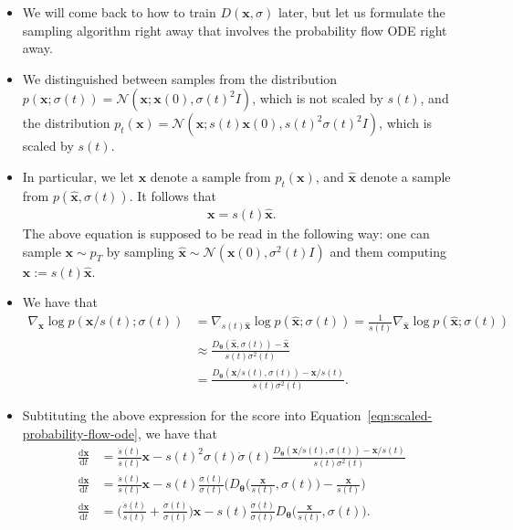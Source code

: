 \documentclass[10pt]{article}
\newcommand{\dee}{\mathrm{d}}
\newcommand{\ve}[1]{\mathbf{#1}}
\newcommand{\ves}[1]{\boldsymbol{#1}}
\newcommand{\mcal}[1]{\mathcal{#1}}
\begin{document}
\begin{itemize}
  \item We will come back to how to train $D(\ve{x},\sigma)$ later, but let us formulate the sampling algorithm right away that involves the probability flow ODE right away.
  
  \item We distinguished between samples from the distribution $p(\ve{x};\sigma(t)) = \mcal{N}(\ve{x}; \ve{x}(0), \sigma(t)^2 I)$, which is not scaled by $s(t)$, and the distribution $p_t(\ve{x}) = \mcal{N}(\ve{x}; s(t)\ve{x}(0), s(t)^2 \sigma(t)^2 I)$, which is scaled by $s(t)$.
    
  \item In particular, we let $\ve{x}$ denote a sample from $p_t(\ve{x})$, and $\hat{\ve{x}}$ denote a sample from $p(\hat{\ve{x}}, \sigma(t))$. It follows that
  \begin{align*}
    \ve{x} = s(t) \hat{\ve{x}}.
  \end{align*}
  The above equation is supposed to be read in the following way: one can sample $\ve{x} \sim p_T$ by sampling $\hat{\ve{x}} \sim \mcal{N}(\ve{x}(0), \sigma^2(t)I)$ and them computing $\ve{x} := s(t)\hat{\ve{x}}$.

  \item We have that
  \begin{align*}
    \nabla_{\ve{x}} \log p(\ve{x}/s(t); \sigma(t))
    &= \nabla_{s(t)\hat{\ve{x}}} \log p(\hat{\ve{x}}; \sigma(t))
    = \frac{1}{s(t)} \nabla_{\hat{\ve{x}}} \log p(\hat{\ve{x}}; \sigma(t)) \\
    &\approx \frac{D_{\ves{\theta}}(\hat{\ve{x}}, \sigma(t)) - \hat{\ve{x}}}{s(t)\sigma^2(t)} \\
    &= \frac{D_{\ves{\theta}}(\ve{x}/s(t), \sigma(t)) - \ve{x}/s(t)}{s(t)\sigma^2(t)}.
  \end{align*}

  \item Subtituting the above expression for the score into Equation~\ref{eqn:scaled-probability-flow-ode}, we have that
  \begin{align*}
    \frac{\dee \ve{x}}{\dee t}
    &= \frac{\dot{s}(t)}{s(t)} \ve{x} - s(t)^2 \sigma(t) \dot{\sigma}(t) \frac{D_{\ves{\theta}}(\ve{x}/s(t), \sigma(t)) - \ve{x}/s(t)}{s(t)\sigma^2(t)} \\
    \frac{\dee \ve{x}}{\dee t}
    &= \frac{\dot{s}(t)}{s(t)} \ve{x} - s(t) \frac{\dot{\sigma}(t)}{\sigma(t)} \bigg( D_{\ves{\theta}}\bigg(\frac{\ve{x}}{s(t)}, \sigma(t)\bigg) - \frac{\ve{x}}{s(t)} \bigg) \\
    \frac{\dee \ve{x}}{\dee t}
    &= \bigg( \frac{\dot{s}(t)}{s(t)} + \frac{\dot{\sigma}(t)}{\sigma(t)} \bigg) \ve{x} - s(t) \frac{\dot{\sigma}(t)}{\sigma(t)} D_{\ves{\theta}}\bigg(\frac{\ve{x}}{s(t)}, \sigma(t)\bigg).
  \end{align*}
\end{itemize}
\end{document}

